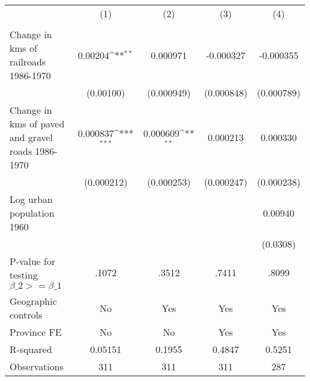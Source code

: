 {
\def\sym#1{\ifmmode^{#1}\else\(^{#1}\)\fi}
\begin{tabular}{l*{4}{c}}
\hline\hline
                &\multicolumn{1}{c}{(1)}&\multicolumn{1}{c}{(2)}&\multicolumn{1}{c}{(3)}&\multicolumn{1}{c}{(4)}\\
                &\multicolumn{1}{c}{}&\multicolumn{1}{c}{}&\multicolumn{1}{c}{}&\multicolumn{1}{c}{}\\
\hline
Change in kms of railroads 1986-1970&  0.00204\sym{**} & 0.000971         &-0.000327         &-0.000355         \\
                &(0.00100)         &(0.000949)         &(0.000848)         &(0.000789)         \\
[1em]
Change in kms of paved and gravel roads 1986-1970& 0.000837\sym{***}& 0.000609\sym{**} & 0.000213         & 0.000330         \\
                &(0.000212)         &(0.000253)         &(0.000247)         &(0.000238)         \\
[1em]
Log urban population 1960&                  &                  &                  &  0.00940         \\
                &                  &                  &                  & (0.0308)         \\
\hline
P-value for testing $\beta\_{2} >= \beta\_{1}$&    .1072         &    .3512         &    .7411         &.8099         \\
Geographic controls&       No         &      Yes         &      Yes         &      Yes         \\
Province FE     &       No         &       No         &      Yes         &      Yes         \\
R-squared       &  0.05151         &   0.1955         &   0.4847         &   0.5251         \\
Observations    &      311         &      311         &      311         &      287         \\
\hline\hline
\end{tabular}
}
